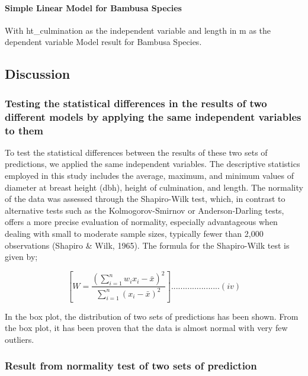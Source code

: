 \documentclass[preprint, 3p,
authoryear]{elsarticle} %
\begin{document}
\hypertarget{simple-linear-model-for-bambusa-species}{%
\paragraph{Simple Linear Model for Bambusa
Species}\label{simple-linear-model-for-bambusa-species}}

With ht\_culmination as the independent variable and length in m as the
dependent variable Model result for Bambusa Species.

\hypertarget{discussion}{%
\subsection{Discussion}\label{discussion}}

\hypertarget{testing-the-statistical-differences-in-the-results-of-two-different-models-by-applying-the-same-independent-variables-to-them}{%
\subsubsection{Testing the statistical differences in the results of two
different models by applying the same independent variables to
them}\label{testing-the-statistical-differences-in-the-results-of-two-different-models-by-applying-the-same-independent-variables-to-them}}

To test the statistical differences between the results of these two
sets of predictions, we applied the same independent variables. The
descriptive statistics employed in this study includes the average,
maximum, and minimum values of diameter at breast height (dbh), height
of culmination, and length. The normality of the data was assessed
through the Shapiro-Wilk test, which, in contrast to alternative tests
such as the Kolmogorov-Smirnov or Anderson-Darling tests, offers a more
precise evaluation of normality, especially advantageous when dealing
with small to moderate sample sizes, typically fewer than 2,000
observations (Shapiro \& Wilk, 1965). The formula for the Shapiro-Wilk
test is given by;

\[[ W = \frac{{\left(\sum_{i=1}^{n} w_i x_i - \bar{x}\right)^2}}{{\sum_{i=1}^{n} (x_i - \bar{x})^2}}].....................(iv)\]

In the box plot, the distribution of two sets of predictions has been
shown. From the box plot, it has been proven that the data is almost
normal with very few outliers.

\hypertarget{result-from-normality-test-of-two-sets-of-prediction}{%
\subsubsection{Result from normality test of two sets of
prediction}\label{result-from-normality-test-of-two-sets-of-prediction}}
\end{document}
